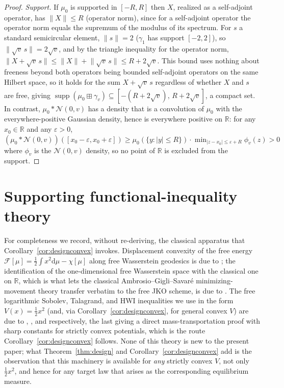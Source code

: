 \documentclass[11pt]{article}
\newcommand{\R}{\mathbb{R}}
\newcommand{\dd}{\mathrm{d}}
\newcommand{\Ent}{\chi}
\newcommand{\norm}[1]{\lVert #1\rVert}
\DeclareMathOperator{\supp}{supp}
\theoremstyle{plain}
\theoremstyle{definition}
\theoremstyle{remark}
\begin{document}
\begin{proof}
\emph{Support.} If $\mu_0$ is supported in $[-R,R]$ then $X$, realized as a
self-adjoint operator, has $\norm{X}\le R$ (operator norm), since for a self-adjoint
operator the operator norm equals the supremum of the modulus of its spectrum. For
$s$ a standard semicircular element, $\norm{s}=2$ ($\gamma_1$ has support $[-2,2]$),
so $\norm{\sqrt v\,s}=2\sqrt v$, and by the triangle inequality for the operator norm,
$\norm{X+\sqrt v\,s}\le\norm{X}+\norm{\sqrt v\,s}\le R+2\sqrt v$. This bound uses
nothing about freeness beyond both operators being bounded self-adjoint operators on
the same Hilbert space, so it holds for the sum $X+\sqrt v\,s$ regardless of whether
$X$ and $s$ are free, giving $\supp(\mu_0\boxplus\gamma_v)\subseteq[-(R+2\sqrt v),\,
R+2\sqrt v]$, a compact set. In contrast, $\mu_0*\mathcal N(0,v)$ has a density that
is a convolution of $\mu_0$ with the everywhere-positive Gaussian density, hence is
everywhere positive on $\R$: for any $x_0\in\R$ and any $\varepsilon>0$,
$(\mu_0*\mathcal N(0,v))([x_0-\varepsilon,x_0+\varepsilon])
\ge\mu_0(\{y:|y|\le R\})\cdot\min_{|z-x_0|\le \varepsilon+R}\phi_v(z)>0$ where $\phi_v$
is the $\mathcal N(0,v)$ density, so no point of $\R$ is excluded from the support.
\end{proof}

\section{Supporting functional-inequality theory}\label{app:inequalities}

For completeness we record, without re-deriving, the classical apparatus that
Corollary~\ref{cor:designconvex} invokes. Displacement convexity of the free energy
$\mathcal F[\mu]=\tfrac12\int x^2\dd\mu-\Ent[\mu]$ along free Wasserstein geodesics is
due to \citet{Biane2003}; the identification of the one-dimensional free Wasserstein
space with the classical one on $\R$, which is what lets the classical
Ambrosio--Gigli--Savar\'e minimizing-movement theory \citep{AGS2008} transfer
verbatim to the free JKO scheme, is due to \citet{BianeVoiculescu2001}. The free
logarithmic Sobolev, Talagrand, and HWI inequalities we use in the form
$V(x)=\tfrac12x^2$ (and, via Corollary~\ref{cor:designconvex}, for general convex $V$)
are due to \citet{Biane2003}, \citet{HiaiPetzUeda2004}, and \citet{LedouxPopescu2009}
respectively, the last giving a direct mass-transportation proof with sharp constants
for strictly convex potentials, which is the route Corollary~\ref{cor:designconvex}
follows. None of this theory is new to the present paper; what Theorem~\ref{thm:design}
and Corollary~\ref{cor:designconvex} add is the observation that this machinery is
available for \emph{any} strictly convex $V$, not only $\tfrac12x^2$, and hence for
any target law that arises as the corresponding equilibrium measure.
\end{document}
